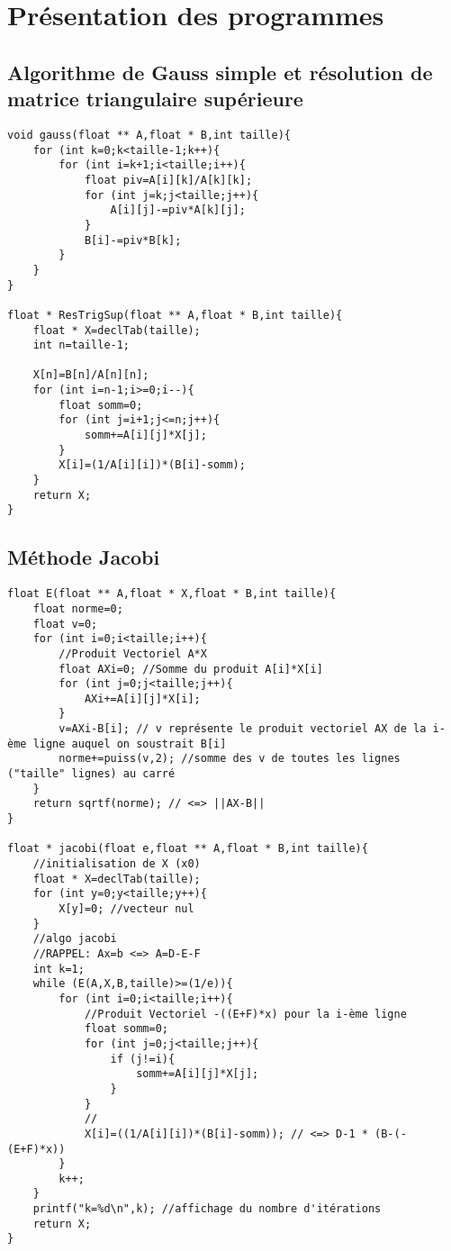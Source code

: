 \documentclass[10pt,a4paper,french]{article}
\begin{document}
\section{Présentation des programmes}
\subsection{Algorithme de Gauss simple et résolution de matrice triangulaire supérieure}

\begin{lstlisting}
void gauss(float ** A,float * B,int taille){
    for (int k=0;k<taille-1;k++){
        for (int i=k+1;i<taille;i++){
            float piv=A[i][k]/A[k][k];
            for (int j=k;j<taille;j++){
                A[i][j]-=piv*A[k][j];
            }
            B[i]-=piv*B[k];
        }
    }
}

float * ResTrigSup(float ** A,float * B,int taille){
    float * X=declTab(taille);
    int n=taille-1;

    X[n]=B[n]/A[n][n];
    for (int i=n-1;i>=0;i--){
        float somm=0;
        for (int j=i+1;j<=n;j++){
            somm+=A[i][j]*X[j];
        }
        X[i]=(1/A[i][i])*(B[i]-somm);
    }
    return X;
}
\end{lstlisting}

\subsection{Méthode Jacobi}
\begin{lstlisting}
float E(float ** A,float * X,float * B,int taille){
    float norme=0;
    float v=0;
    for (int i=0;i<taille;i++){
        //Produit Vectoriel A*X
        float AXi=0; //Somme du produit A[i]*X[i]
        for (int j=0;j<taille;j++){
            AXi+=A[i][j]*X[i];
        }
        v=AXi-B[i]; // v représente le produit vectoriel AX de la i-ème ligne auquel on soustrait B[i]
        norme+=puiss(v,2); //somme des v de toutes les lignes ("taille" lignes) au carré
    }
    return sqrtf(norme); // <=> ||AX-B||
}

float * jacobi(float e,float ** A,float * B,int taille){
    //initialisation de X (x0)
    float * X=declTab(taille);
    for (int y=0;y<taille;y++){
        X[y]=0; //vecteur nul
    }
    //algo jacobi
    //RAPPEL: Ax=b <=> A=D-E-F
    int k=1;
    while (E(A,X,B,taille)>=(1/e)){
        for (int i=0;i<taille;i++){
            //Produit Vectoriel -((E+F)*x) pour la i-ème ligne
            float somm=0;
            for (int j=0;j<taille;j++){
                if (j!=i){
                    somm+=A[i][j]*X[j];
                }
            }
            //
            X[i]=((1/A[i][i])*(B[i]-somm)); // <=> D-1 * (B-(-(E+F)*x))
        }
        k++;
    }
    printf("k=%d\n",k); //affichage du nombre d'itérations
    return X;
}
\end{lstlisting}
\end{document}
